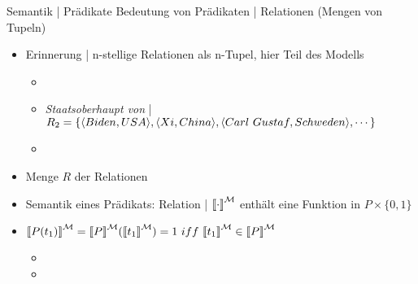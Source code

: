 \begin{frame}
  {Semantik | Prädikate}
  \onslide<+->
  \onslide<+->
  Bedeutung von Prädikaten | \alert{Relationen} (Mengen von Tupeln)\\
  \Halbzeile
  \begin{itemize}[<+->]
    \item Erinnerung | n-stellige Relationen als \alert{n-Tupel}, hier Teil des Modells
      \begin{itemize}[<+->]
        \item {}
        \item \textit{Staatsoberhaupt von} | $R_2=\{\tuple{Biden,USA},\tuple{Xi,China},\tuple{Carl\ Gustaf,Schweden},\cdots\}$
        \item {}
      \end{itemize}
      \Halbzeile
    \item Menge $R$ der Relationen 
    \item Semantik eines Prädikats: Relation | ${\llbracket{}\cdot\rrbracket}^{\mathcal{M}}$ enthält eine Funktion in $P\times \{0,1\}$
    \item \alert{$\dem{P(t_1)}^{\Model}=\dem{P}^{\Model}(\dem{t_1}^{\Model})=1\ iff\ \dem{t_1}^{\Model}\in\dem{P}^{\Model}$}\\
      \Viertelzeile
      \begin{itemize}[<+->]
        \item {}
        \item {}
      \end{itemize}
  \end{itemize}
\end{frame}

